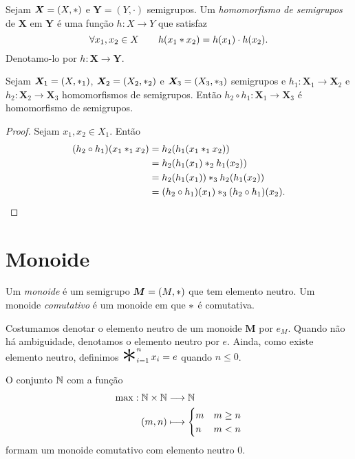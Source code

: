\begin{defi}
	Sejam $\bm X=(X, \ast )$ e $\bm Y=(Y,\cdot)$ semigrupos. Um \emph{homomorfismo de semigrupos} de $\bm X$ em $\bm Y$ é uma função $h: X \to Y$ que satisfaz
	\begin{equation*}
	\forall x_1,x_2 \in X \qquad h(x_1  \ast  x_2)=h(x_1) \cdot h(x_2).
	\end{equation*}
\noindent Denotamo-lo por $h: \bm X \to \bm Y$. %
\end{defi}

\begin{prop}
\label{comp.hom.sem}
	Sejam $\bm X_1=(X, \ast _1)$, $\bm X_2=(X_2, \ast _2)$ e $\bm X_3=(X_3, \ast _3)$ semigrupos e $h_1: \bm X_1 \to \bm X_2$ e $h_2: \bm X_2 \to \bm X_3$ homomorfismos de semigrupos. Então $h_2 \circ h_1: \bm X_1 \to \bm X_3$ é homomorfismo de semigrupos.
\end{prop}
\begin{proof}
	Sejam $x_1,x_2 \in X_1$. Então
	\begin{align*}
	(h_2 \circ h_1)(x_1  \ast _1 x_2) &= h_2(h_1(x_1  \ast _1 x_2)) \\
		&= h_2(h_1(x_1)  \ast _2 h_1(x_2)) \\
		&= h_2(h_1 (x_1))  \ast _3 h_2(h_1(x_2)) \\
		&= (h_2 \circ h_1)(x_1)  \ast _3 (h_2 \circ h_1)(x_2).
	\end{align*}
\end{proof}

\section{Monoide}

\begin{defi}
	Um \emph{monoide} é um semigrupo $\bm M=(M, \ast )$ que tem elemento neutro. Um monoide \emph{comutativo} é um monoide em que $ \ast $ é comutativa.
\end{defi}

\begin{nota}
	Costumamos denotar o elemento neutro de um monoide $\bm M$ por $e_M$. Quando não há ambiguidade, denotamos o elemento neutro por $e$. Ainda, como existe elemento neutro, definimos $\bigopb_{i=1}^n x_i = e$ quando $n\leq 0$.
\end{nota}

\begin{ex}
	O conjunto $\mathbb{N}$ com a função
	\begin{align*}
	\max: \mathbb{N} \times \mathbb{N} &\longrightarrow \mathbb{N} \\
		(m,n) &\longmapsto
			\begin{cases}
			m 	& m \geq n \\
			n 		& m<n
			\end{cases}
	\end{align*}
formam um monoide comutativo com elemento neutro 0.
\end{ex}

